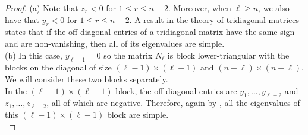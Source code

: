 \documentclass[11pt]{article}
\theoremstyle{definition}
\numberwithin{equation}{section}
\begin{document}
\begin{proof}
    (a) Note that $z_r < 0$ for $1 \leq r \leq n-2$.  Moreover, when $\ell \geq n$, we also have that $y_r < 0$ for $1 \leq r \leq n-2$.  A result in the theory of tridiagonal matrices \cite{ParlettBook} states that if the off-diagonal entries of a tridiagonal matrix have the same sign and are non-vanishing, then all of its eigenvalues are simple.     \\
    
     (b) In this case, $y_{\ell-1} = 0$ so the matrix $N_\ell$ is block lower-triangular with the blocks on the diagonal of size $(\ell -1) \times (\ell - 1)$ and $(n-\ell) \times (n - \ell)$. We will consider these two blocks separately. \\
     
	\indent In the $(\ell-1) \times (\ell -1)$ block, the off-diagonal entries are $y_1, \ldots, y_{\ell - 2}$ and $z_1, \ldots, z_{\ell - 2}$, all of which are negative.   Therefore, again by \cite{ParlettBook}, all the eigenvalues of this $(\ell - 1) \times (\ell - 1)$ block are simple.  \\
     

\end{proof}
\end{document}

